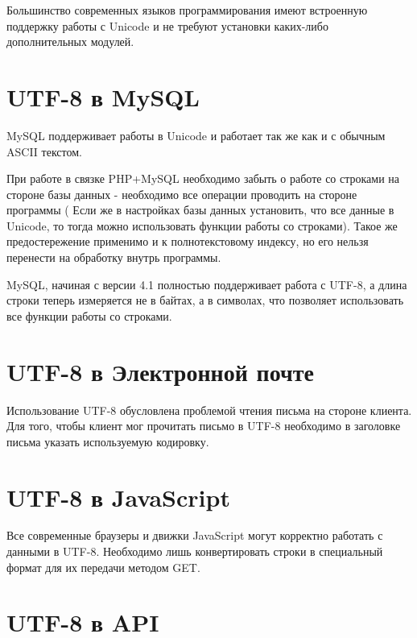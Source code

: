 Большинство современных языков программирования имеют встроенную поддержку работы с Unicode  и не требуют установки каких-либо дополнительных модулей. 


\section{ UTF-8 в MySQL } \label{sect4_11}

MySQL поддерживает работы в Unicode и работает так же как и с обычным ASCII текстом.

При работе в связке PHP+MySQL необходимо забыть о работе со строками на стороне базы данных - необходимо все операции проводить на стороне программы ( Если же в настройках базы данных установить, что все данные в Unicode, то тогда можно использовать функции работы со строками). Такое же предостережение применимо и к полнотекстовому индексу, но его нельзя перенести на обработку внутрь программы.


MySQL, начиная с версии 4.1 полностью поддерживает работа с UTF-8, а длина строки теперь измеряется не в байтах, а в символах, что позволяет использовать все функции работы со строками.


\section{ UTF-8 в Электронной почте } \label{sect4_12}


Использование UTF-8 обусловлена проблемой чтения письма на стороне клиента. Для того, чтобы клиент мог прочитать письмо в UTF-8 необходимо в заголовке письма указать используемую кодировку.

\section{ UTF-8 в JavaScript } \label{sect4_13}


Все современные браузеры и движки JavaScript могут корректно работать с данными в UTF-8. Необходимо лишь конвертировать строки в специальный формат для их передачи методом GET.


\section{ UTF-8 в API } \label{sect4_14}














